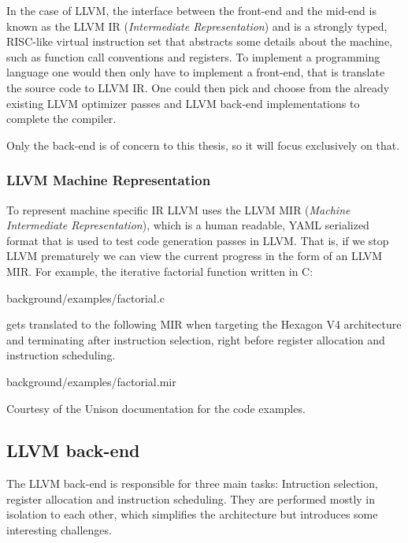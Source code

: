 In the case of LLVM, the interface between the front-end and the mid-end is known as the
LLVM IR (\textit{Intermediate Representation}) and is a strongly typed, RISC-like virtual
instruction set that abstracts some details about the machine, such as function call
conventions and registers. To implement a programming language one would then only have to
implement a front-end, that is translate the source code to LLVM IR. One could then pick
and choose from the already existing LLVM optimizer passes and LLVM back-end implementations
to complete the compiler.

Only the back-end is of concern to this thesis, so it will focus exclusively on that.

\subsubsection{LLVM Machine Representation}

To represent machine specific IR LLVM uses the LLVM MIR (\textit{Machine Intermediate Representation}),
which is a human readable, YAML serialized format that is used to test code generation passes
in LLVM. That is, if we stop LLVM prematurely we can view the current progress in the form
of an LLVM MIR. For example, the iterative factorial function written in C:


{background/examples/factorial.c}

gets translated to the following MIR when targeting the Hexagon V4 architecture and
terminating after instruction selection, right before register allocation and instruction
scheduling.


{background/examples/factorial.mir}

Courtesy of the Unison documentation for the code examples.

\subsection{LLVM back-end}

The LLVM back-end is responsible for three main tasks: Intruction selection, register
allocation and instruction scheduling. They are performed mostly in isolation to each
other, which simplifies the architecture but introduces some interesting challenges.

